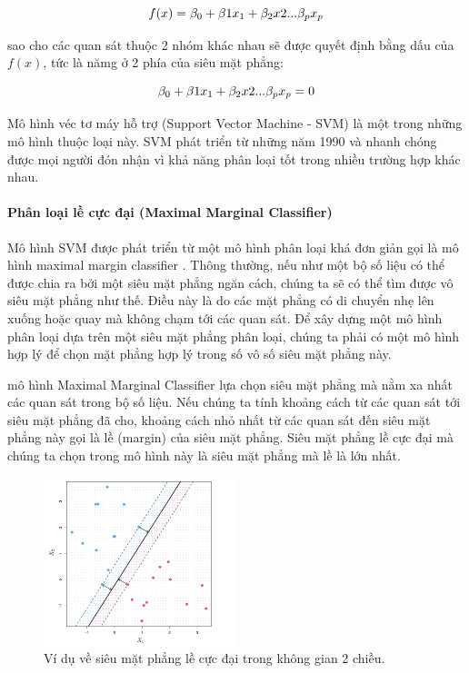 \documentclass[a4paper]{report}\usepackage[]{graphicx}\usepackage[]{color}
\begin{document}
$$
\large
f(x) = \beta_0 + \beta1 x_1 + \beta_2 x2 ...\beta_p x_p
$$

sao cho các quan sát thuộc 2 nhóm khác nhau sẽ được quyết định bằng dấu của $f(x)$, tức là nămg ở 2 phía của siêu mặt phẳng:

$$
\large
\beta_0 + \beta1 x_1 + \beta_2 x2 ...\beta_p x_p = 0
$$

Mô hình véc tơ máy hỗ trợ (Support Vector Machine - SVM) là một trong những mô hình thuộc loại này. SVM phát triển từ những năm 1990 và nhanh chóng được mọi người đón nhận vì khả năng phân loại tốt trong nhiều trường hợp khác nhau.

\paragraph{Phân loại lề cực đại (Maximal Marginal Classifier)}
Mô hình SVM được phát triển từ một mô hình phân loại khá đơn giản gọi là mô hình maximal margin classifier \parencite{boser1992training}. Thông thường, nếu như một bộ số liệu có thể được chia ra bởi một siêu mặt phẳng ngăn cách, chúng ta sẽ có thể tìm được vô siêu mặt phẳng như thế. Điều này là do các mặt phẳng có di chuyển nhẹ lên xuống hoặc quay mà không chạm tới các quan sát. Để xây dựng một mô hình phân loại dựa trên một siêu mặt phẳng phân loại,  chúng ta phải có một mô hình hợp lý để chọn mặt phẳng hợp lý trong số vô số siêu mặt phẳng này.

mô hình Maximal Marginal Classifier lựa chọn siêu mặt phẳng mà nằm xa nhất các quan sát trong bộ số liệu. Nếu chúng ta tính khoảng cách từ các quan sát tới siêu mặt phẳng đã cho, khoảng cách nhỏ nhất từ các quan sát đến siêu mặt phẳng này gọi là lề (margin) của siêu mặt phẳng. Siêu mặt phẳng lề cực đại mà chúng ta chọn trong mô hình này là siêu mặt phẳng mà lề là lớn nhất.

\begin{figure}
  \centering
   \includegraphics[width=0.5\textwidth]{./Figures/maxim_margin_example.png}
   \caption{Ví dụ về siêu mặt phẳng lề cực đại trong không gian 2 chiều.}
   \label{fig:maxim_margin_example}
\end{figure}
\end{document}
